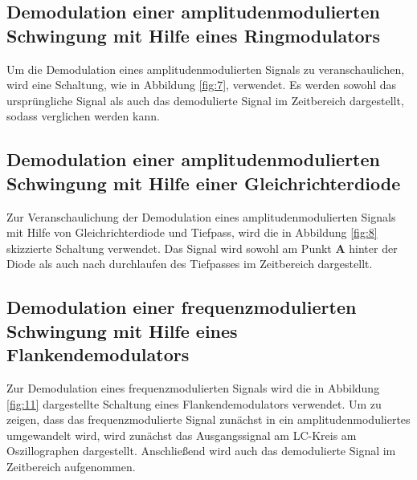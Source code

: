 \FloatBarrier
\subsection{Demodulation einer amplitudenmodulierten Schwingung
mit Hilfe eines Ringmodulators}
\label{subsec:durchfuehrung_f}
Um die Demodulation eines amplitudenmodulierten Signals zu veranschaulichen,
wird eine Schaltung, wie in Abbildung \ref{fig:7},
verwendet. Es werden sowohl das ursprüngliche Signal als auch das
demodulierte Signal im Zeitbereich dargestellt, sodass verglichen werden kann.


\FloatBarrier
\subsection{Demodulation einer amplitudenmodulierten Schwingung
mit Hilfe einer Gleichrichterdiode}
\label{subsec:durchfuehrung_g}
Zur Veranschaulichung der Demodulation eines amplitudenmodulierten Signals
mit Hilfe von Gleichrichterdiode und Tiefpass, wird die in Abbildung
\ref{fig:8} skizzierte Schaltung verwendet.
Das Signal wird sowohl am Punkt \textbf{A} hinter der Diode als auch nach durchlaufen des Tiefpasses
im Zeitbereich dargestellt.


\FloatBarrier
\subsection{Demodulation einer frequenzmodulierten Schwingung
mit Hilfe eines Flankendemodulators}
\label{subsec:durchfuehrung_h}
Zur Demodulation eines frequenzmodulierten Signals wird die in Abbildung
\ref{fig:11} dargestellte Schaltung eines Flankendemodulators verwendet.
Um zu zeigen, dass das frequenzmodulierte Signal zunächst in ein
amplitudenmoduliertes umgewandelt wird, wird zunächst das Ausgangssignal
am LC-Kreis am Oszillographen dargestellt. Anschließend wird
auch das demodulierte Signal im Zeitbereich aufgenommen.
